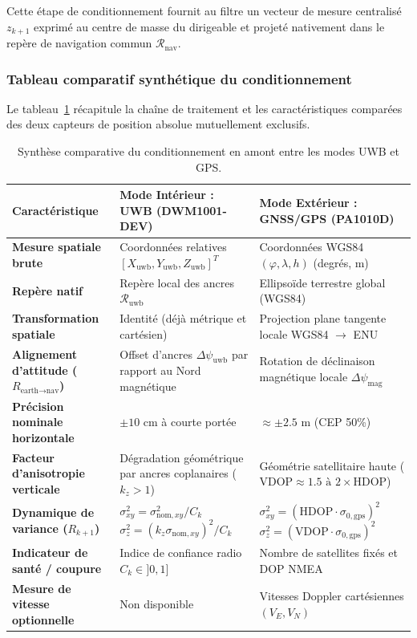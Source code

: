 \documentclass[../Formulations_Kalman.tex]{subfiles}
\begin{document}
Cette étape de conditionnement fournit au filtre un vecteur de mesure centralisé $z_{k+1}$ exprimé au centre de masse du dirigeable et projeté nativement dans le repère de navigation commun $\mathcal{R}_{\text{nav}}$.

\subsubsection{Tableau comparatif synthétique du conditionnement}
Le tableau~\ref{tab:comparaison_capteurs} récapitule la chaîne de traitement et les caractéristiques comparées des deux capteurs de position absolue mutuellement exclusifs.

\begin{table}[htbp]
\centering
\small
\begin{tabular}{p{4.2cm} p{5.0cm} p{5.5cm}}
\toprule
\textbf{Caractéristique} & \textbf{Mode Intérieur : UWB (DWM1001-DEV)} & \textbf{Mode Extérieur : GNSS/GPS (PA1010D)} \\
\midrule
\textbf{Mesure spatiale brute} & Coordonnées relatives $[X_{\text{uwb}}, Y_{\text{uwb}}, Z_{\text{uwb}}]^T$ & Coordonnées WGS84 $(\varphi, \lambda, h)$ (degrés, m) \\
\textbf{Repère natif} & Repère local des ancres $\mathcal{R}_{\text{uwb}}$ & Ellipsoïde terrestre global (WGS84) \\
\textbf{Transformation spatiale} & Identité (déjà métrique et cartésien) & Projection plane tangente locale WGS84 $\to$ ENU \\
\textbf{Alignement d'attitude ($R_{\text{earth} \to \text{nav}}$)} & Offset d'ancres $\Delta\psi_{\text{uwb}}$ par rapport au Nord magnétique & Rotation de déclinaison magnétique locale $\Delta\psi_{\text{mag}}$ \\
\textbf{Précision nominale horizontale} & $\pm 10\text{ cm}$ à courte portée & $\approx \pm 2.5\text{ m}$ (CEP 50\%) \\
\textbf{Facteur d'anisotropie verticale} & Dégradation géométrique par ancres coplanaires ($k_z > 1$) & Géométrie satellitaire haute ($\text{VDOP} \approx 1.5 \text{ à } 2 \times \text{HDOP}$) \\
\textbf{Dynamique de variance ($R_{k+1}$)} & $\sigma_{xy}^2 = \sigma_{\text{nom},xy}^2 / C_k$ \newline $\sigma_{z}^2 = (k_z \sigma_{\text{nom},xy})^2 / C_k$ & $\sigma_{xy}^2 = (\text{HDOP} \cdot \sigma_{0,\text{gps}})^2$ \newline $\sigma_{z}^2 = (\text{VDOP} \cdot \sigma_{0,\text{gps}})^2$ \\
\textbf{Indicateur de santé / coupure} & Indice de confiance radio $C_k \in ]0, 1]$ & Nombre de satellites fixés et DOP NMEA \\
\textbf{Mesure de vitesse optionnelle} & Non disponible & Vitesses Doppler cartésiennes $(V_E, V_N)$ \\
\bottomrule
\end{tabular}
\caption{Synthèse comparative du conditionnement en amont entre les modes UWB et GPS.}
\label{tab:comparaison_capteurs}
\end{table}
\end{document}
